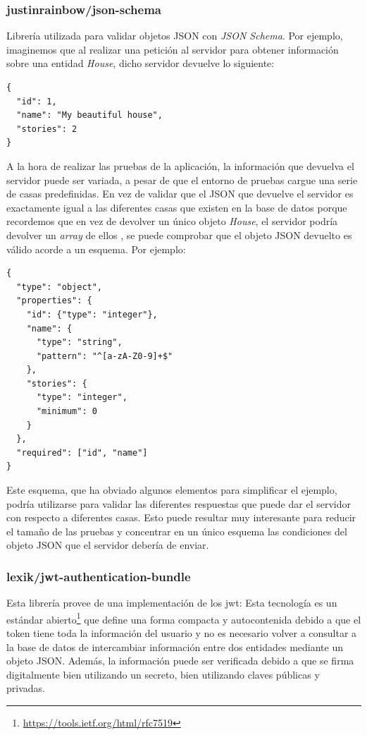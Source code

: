 \subsubsection{justinrainbow/json-schema}
Librería utilizada para validar objetos JSON con \textit{JSON Schema}. Por
ejemplo, imaginemos que al realizar una petición al servidor para
obtener información sobre una entidad \textit{House}, dicho servidor devuelve
lo siguiente:
\begin{verbatim}
{
  "id": 1,
  "name": "My beautiful house",
  "stories": 2
}
\end{verbatim}
A la hora de realizar las pruebas de la aplicación, la información que devuelva
el servidor puede ser variada, a pesar de que el entorno de pruebas cargue una
serie de casas predefinidas. En vez de validar que el JSON que devuelve el
servidor es exactamente igual a las diferentes casas que existen en la base de
datos \textemdash porque recordemos que en vez de devolver un único objeto
\textit{House}, el servidor podría devolver un \textit{array} de ellos
\textemdash, se puede comprobar que el objeto JSON devuelto es válido acorde a
un esquema. Por ejemplo:

\begin{verbatim}
{
  "type": "object",
  "properties": {
    "id": {"type": "integer"},
    "name": {
      "type": "string",
      "pattern": "^[a-zA-Z0-9]+$"
    },
    "stories": {
      "type": "integer",
      "minimum": 0
    }
  },
  "required": ["id", "name"]
}
\end{verbatim}
Este esquema, que ha obviado algunos elementos para simplificar el ejemplo,
podría utilizarse para validar las diferentes respuestas que puede dar el
servidor con respecto a diferentes casas. Esto puede resultar muy interesante
para reducir el tamaño de las pruebas y concentrar en un único esquema las
condiciones del objeto JSON que el servidor debería de enviar.

\subsubsection{lexik/jwt-authentication-bundle}
Esta librería provee de una implementación de los \gls{jwt}: Esta tecnología
es un estándar abierto\footnote{\url{https://tools.ietf.org/html/rfc7519}} que
define una forma compacta y autocontenida \textemdash debido a que el token
tiene toda la información del usuario y no es necesario volver a consultar a la
base de datos \textemdash de intercambiar
información entre dos entidades mediante un objeto JSON. Además, la información
puede ser verificada debido a que se firma digitalmente bien utilizando un
secreto, bien utilizando claves públicas y privadas. \cite{jwt_explanation}

